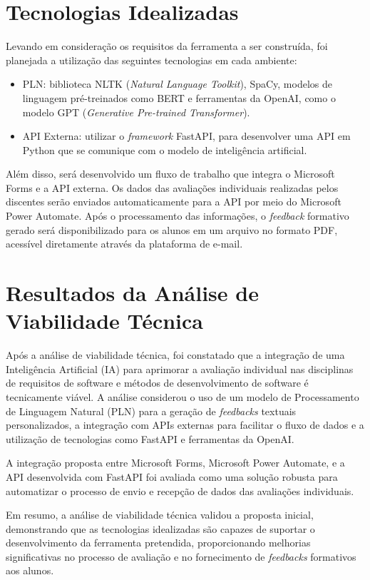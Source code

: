 \section{Tecnologias Idealizadas}

Levando em consideração os requisitos da ferramenta a ser construída, foi planejada a utilização das seguintes tecnologias em cada ambiente:

\begin{itemize}
  \item PLN: biblioteca NLTK (\textit{Natural Language Toolkit}), SpaCy, modelos de linguagem pré-treinados como BERT e ferramentas da OpenAI, como o modelo GPT (\textit{Generative Pre-trained Transformer}).
  \item API Externa: utilizar o \textit{framework} FastAPI, para desenvolver uma API em Python que se comunique com o modelo de inteligência artificial.
\end{itemize}

Além disso, será desenvolvido um fluxo de trabalho que integra o Microsoft Forms e a API externa. Os dados das avaliações individuais realizadas pelos discentes serão enviados automaticamente para a API por meio do Microsoft Power Automate. Após o processamento das informações, o \textit{feedback} formativo gerado será disponibilizado para os alunos em um arquivo no formato PDF, acessível diretamente através da plataforma de e-mail.

\section{Resultados da Análise de Viabilidade Técnica}

Após a análise de viabilidade técnica, foi constatado que a integração de uma Inteligência Artificial (IA) para aprimorar a avaliação individual nas disciplinas de requisitos de software e métodos de desenvolvimento de software é tecnicamente viável. A análise considerou o uso de um modelo de Processamento de Linguagem Natural (PLN) para a geração de \textit{feedbacks} textuais personalizados, a integração com APIs externas para facilitar o fluxo de dados e a utilização de tecnologias como FastAPI e ferramentas da OpenAI.

A integração proposta entre Microsoft Forms, Microsoft Power Automate, e a API desenvolvida com FastAPI foi avaliada como uma solução robusta para automatizar o processo de envio e recepção de dados das avaliações individuais.

Em resumo, a análise de viabilidade técnica validou a proposta inicial, demonstrando que as tecnologias idealizadas são capazes de suportar o desenvolvimento da ferramenta pretendida, proporcionando melhorias significativas no processo de avaliação e no fornecimento de \textit{feedbacks} formativos aos alunos.
